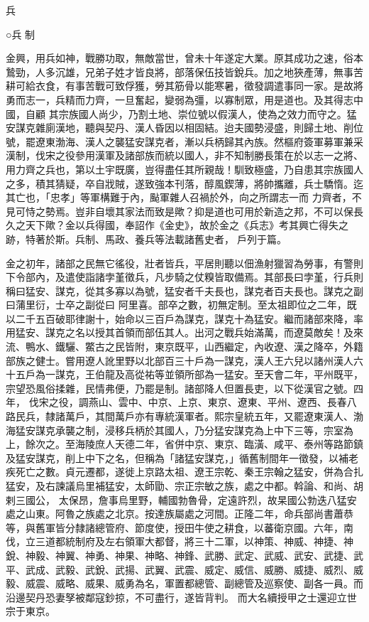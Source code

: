 
\begin{pinyinscope}

 兵



 ○兵
 制



 金興，用兵如神，戰勝功取，無敵當世，曾未十年遂定大業。原其成功之速，俗本鷙勁，人多沉雄，兄弟子姓才皆良將，部落保伍技皆銳兵。加之地狹產薄，無事苦耕可給衣食，有事苦戰可致俘獲，勞其筋骨以能寒暑，徵發調遣事同一家。是故將勇而志一，兵精而力齊，一旦奮起，變弱為彊，以寡制眾，用是道也。及其得志中國，自顧
 其宗族國人尚少，乃割土地、崇位號以假漢人，使為之效力而守之。猛安謀克雜廁漢地，聽與契丹、漢人昏因以相固結。迨夫國勢浸盛，則歸土地、削位號，罷遼東渤海、漢人之襲猛安謀克者，漸以兵柄歸其內族。然樞府簽軍募軍兼采漢制，伐宋之役參用漢軍及諸部族而統以國人，非不知制勝長策在於以志一之將、用力齊之兵也，第以土宇既廣，豈得盡任其所親哉！馴致極盛，乃自患其宗族國人之多，積其猜疑，卒自戕賊，遂致強本刊落，醇風鍥薄，將帥攜離，兵士驕惰。迄其亡也，「忠孝」等軍構難于內，颭軍雜人召禍於外，向之所謂志一而
 力齊者，不見可恃之勢焉。豈非自壞其家法而致是歟？抑是道也可用於新造之邦，不可以保長久之天下歟？金以兵得國，奉詔作《金史》，故於金之《兵志》考其興亡得失之跡，特著於斯。兵制、馬政、養兵等法載諸舊史者，戶列于篇。



 金之初年，諸部之民無它徭役，壯者皆兵，平居則聽以佃漁射獵習為勞事，有警則下令部內，及遣使詣諸孛堇徵兵，凡步騎之仗糗皆取備焉。其部長曰孛堇，行兵則稱曰猛安、謀克，從其多寡以為號，猛安者千夫長也，謀克者百夫長也。謀克之副曰蒲里衍，士卒之副從曰
 阿里喜。部卒之數，初無定制。至太祖即位之二年，既以二千五百破耶律謝十，始命以三百戶為謀克，謀克十為猛安。繼而諸部來降，率用猛安、謀克之名以授其首領而部伍其人。出河之戰兵始滿萬，而遼莫敵矣！及來流、鴨水、鐵驪、鱉古之民皆附，東京既平，山西繼定，內收遼、漢之降卒，外籍部族之健士。嘗用遼人訛里野以北部百三十戶為一謀克，漢人王六兒以諸州漢人六十五戶為一謀克，王伯龍及高從祐等並領所部為一猛安。至天會二年，平州既平，宗望恐風俗揉雜，民情弗便，乃罷是制。諸部降人但置長吏，以下從漢官之號。四年，
 伐宋之役，調燕山、雲中、中京、上京、東京、遼東、平州、遼西、長春八路民兵，隸諸萬戶，其間萬戶亦有專統漢軍者。熙宗皇統五年，又罷遼東漢人、渤海猛安謀克承襲之制，浸移兵柄於其國人，乃分猛安謀克為上中下三等，宗室為上，餘次之。至海陵庶人天德二年，省併中京、東京、臨潢、咸平、泰州等路節鎮及猛安謀克，削上中下之名，但稱為「諸猛安謀克，」循舊制間年一徵發，以補老疾死亡之數。貞元遷都，遂徙上京路太祖、遼王宗乾、秦王宗翰之猛安，併為合扎猛安，及右諫議烏里補猛安，太師勖、宗正宗敏之族，處之中都。斡論、和尚、胡剌三國公，
 太保昂，詹事烏里野，輔國勃魯骨，定遠許烈，故杲國公勃迭八猛安處之山東。阿魯之族處之北京。按達族屬處之河間。正隆二年，命兵部尚書蕭恭等，與舊軍皆分隸諸總管府、節度使，授田牛使之耕食，以蕃衛京國。六年，南伐，立三道都統制府及左右領軍大都督，將三十二軍，以神策、神威、神捷、神銳、神毅、神翼、神勇、神果、神略、神鋒、武勝、武定、武威、武安、武捷、武平、武成、武毅、武銳、武揚、武翼、武震、威定、威信、威勝、威捷、威烈、威毅、威震、威略、威果、威勇為名，軍置都總管、副總管及巡察使、副各一員。而沿邊契丹恐妻孥被鄰寇鈔掠，不可盡行，遂皆背判。
 而大名續授甲之士還迎立世宗于東京。




\end{pinyinscope}

